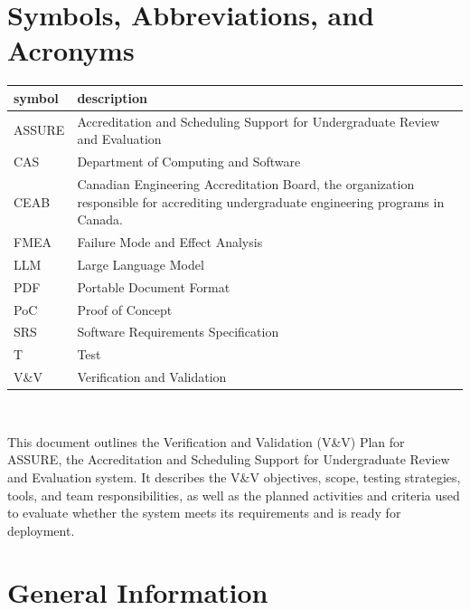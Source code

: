 \documentclass[12pt, titlepage]{article}
\begin{document}
\tableofcontents

\listoftables


\newpage

\section{Symbols, Abbreviations, and Acronyms}

\renewcommand{\arraystretch}{1.2}
\begin{tabularx}{\textwidth}{l X} 
  \toprule		
  \textbf{symbol} & \textbf{description}\\
  \midrule 
  ASSURE & Accreditation and Scheduling Support for Undergraduate Review and Evaluation\\
  CAS & Department of Computing and Software\\
  CEAB & Canadian Engineering Accreditation Board, the organization responsible for accrediting undergraduate engineering programs in Canada.\\
  FMEA & Failure Mode and Effect Analysis\\
  LLM & Large Language Model\\
  PDF & Portable Document Format\\
  PoC & Proof of Concept\\
  SRS & Software Requirements Specification \citep{TeamBVSH2026SRS}\\
  T & Test\\
  V\&V & Verification and Validation\\
  \bottomrule
\end{tabularx}\\


\newpage


This document outlines the Verification and Validation (V\&V) Plan for ASSURE, the Accreditation and Scheduling Support for Undergraduate Review and Evaluation system. It describes the V\&V objectives, scope, testing strategies, tools, and team responsibilities, as well as the planned activities and criteria used to evaluate whether the system meets its requirements and is ready for deployment.


\section{General Information}
\end{document}
